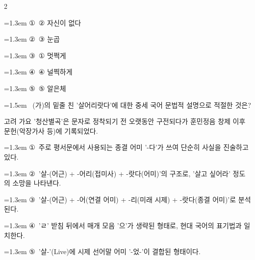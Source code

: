 \documentclass[10pt, a4paper]{article}
\begin{document}
\begin{multicols}{2}
\begin{minipage}{\columnwidth}
\vspace{0.5mm}
{\hangindent=1.3em  \noindent\hspace{0.3em}①~② 자신이 없다\par}
{\hangindent=1.3em  \noindent\hspace{0.3em}②~③ 눈곱\par}
{\hangindent=1.3em  \noindent\hspace{0.3em}③~① 멋쩍게\par}
{\hangindent=1.3em  \noindent\hspace{0.3em}④~④ 널찍하게\par}
{\hangindent=1.3em  \noindent\hspace{0.3em}⑤~⑤ 알은체\par}
\vspace{4mm}
\end{minipage}
\par

\noindent\begin{minipage}{\columnwidth}
\vspace{2mm}
{\hangindent=1.5em  ~(가)의 밑줄 친 '살어리랏다'에 대한 중세 국어 문법적 설명으로 적절한 것은?\par}

\vspace{1mm}
\begin{boxibox}
고려 가요 '청산별곡'은 문자로 정착되기 전 오랫동안 구전되다가 훈민정음 창제 이후 문헌(악장가사 등)에 기록되었다. \\
\end{boxibox}
\vspace{1mm}

\vspace{0.5mm}
{\hangindent=1.3em  \noindent\hspace{0.3em}①~주로 평서문에서 사용되는 종결 어미 '-다'가 쓰여 단순히 사실을 진술하고 있다.\par}
{\hangindent=1.3em  \noindent\hspace{0.3em}②~'살-(어근) + -어리(접미사) + -랏다(어미)'의 구조로, '살고 싶어라' 정도의 소망을 나타낸다.\par}
{\hangindent=1.3em  \noindent\hspace{0.3em}③~'살-(어근) + -어(연결 어미) + -리(미래 시제) + -랏다(종결 어미)'로 분석된다.\par}
{\hangindent=1.3em  \noindent\hspace{0.3em}④~'ㄹ' 받침 뒤에서 매개 모음 '으'가 생략된 형태로, 현대 국어의 표기법과 일치한다.\par}
{\hangindent=1.3em  \noindent\hspace{0.3em}⑤~'살-'(Live)에 시제 선어말 어미 '-었-'이 결합된 형태이다.\par}
\vspace{4mm}
\end{minipage}
\par


\end{multicols}
\end{document}
